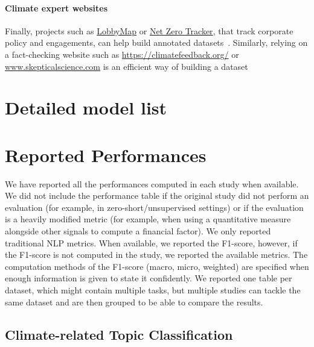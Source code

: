 
\paragraph{Climate expert websites} Finally, projects such as \href{https://lobbymap.org/}{LobbyMap} or \href{https://zerotracker.net/}{Net Zero Tracker}, that track corporate policy and engagements, can help build annotated datasets~\cite{morio2023an, tobias_schimanski_climatebert-netzero_2023}. Similarly, relying on a fact-checking website such as \url{https://climatefeedback.org/} or \url{www.skepticalscience.com} is an efficient way of building a dataset~\cite{jin-etal-2022-logical, varini_climatext_2020, coanComputerassistedClassificationContrarian2021}


\newpage

\section{Detailed model list}



\newpage

\section{Reported Performances}\label{app:perf}

We have reported all the performances computed in each study when available. We did not include the performance table if the original study did not perform an evaluation (for example, in zero-short/unsupervised settings) or if the evaluation is a heavily modified metric (for example, when using a quantitative measure alongside other signals to compute a financial factor). We only reported traditional NLP metrics. When available, we reported the F1-score, however, if the F1-score is not computed in the study, we reported the available metrics. The computation methods of the F1-score (macro, micro, weighted) are specified when enough information is given to state it confidently. We reported one table per dataset, which might contain multiple tasks, but multiple studies can tackle the same dataset and are then grouped to be able to compare the results. 

\subsection{Climate-related Topic Classification}

